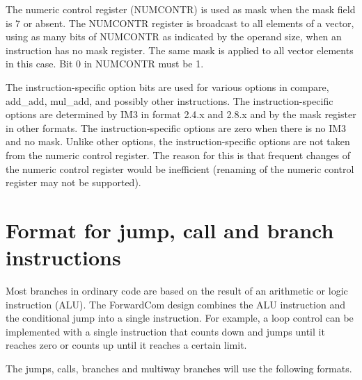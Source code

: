 \documentclass[forwardcom.tex]{subfiles}
\begin{document}
The numeric control register (NUMCONTR) is used as mask when the mask field is 7 or absent. The NUMCONTR register is broadcast to all elements of a vector, using as many bits of NUMCONTR as indicated by the operand size, when an instruction has no mask register. 
The same mask is applied to all vector elements in this case. 
Bit 0 in NUMCONTR must be 1.
\vspace{2mm}

The instruction-specific option bits are used for various options in compare, add\_add, mul\_add, and possibly other instructions. The instruction-specific options are determined by IM3 in format 2.4.x and 2.8.x and by the mask register in other formats. The instruction-specific options are zero when there is no IM3 and no mask. Unlike other options, the instruction-specific options are not taken from the numeric control register. The reason for this is that frequent changes of the numeric control register would be inefficient (renaming of the numeric control register may not be supported).


\section{Format for jump, call and branch instructions}
Most branches in ordinary code are based on the result of an arithmetic or logic instruction (ALU). The ForwardCom design combines the ALU instruction and the conditional jump into a single instruction. For example, a loop control can be implemented with a single instruction that counts down and jumps until it reaches zero or counts up until it reaches a certain limit.
\vspace{2mm}

The jumps, calls, branches and multiway branches will use the following formats.
\end{document}
